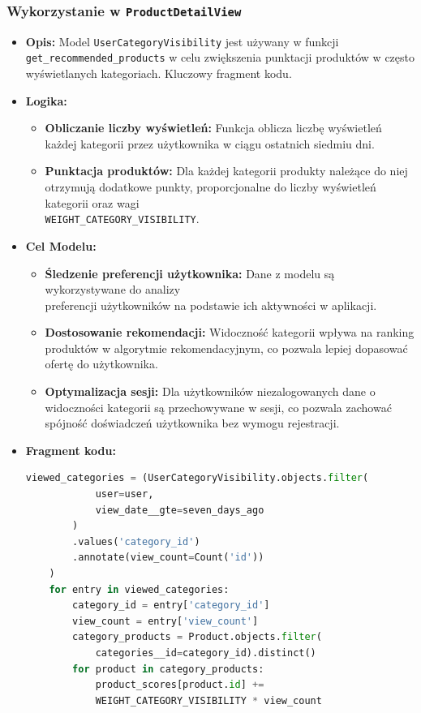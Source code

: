 \documentclass[12pt,a4paper,oneside]{article}
\theoremstyle{definition}
\numberwithin{equation}{section}
\begin{document}
\subsubsection{Wykorzystanie w \texttt{ProductDetailView}}
\begin{itemize}
    \item \textbf{Opis: }Model \texttt{UserCategoryVisibility} jest używany w funkcji 
        \texttt{get\_recommended\_products} w celu zwiększenia punktacji produktów w 
        często wyświetlanych kategoriach. Kluczowy fragment kodu.

    \item \textbf{Logika:}
        \begin{itemize}
            \item \textbf{Obliczanie liczby wyświetleń:} Funkcja oblicza liczbę wyświetleń każdej 
            kategorii przez użytkownika w ciągu ostatnich siedmiu dni.
            \item \textbf{Punktacja produktów:} Dla każdej kategorii produkty należące do niej otrzymują 
            dodatkowe punkty, proporcjonalne do liczby wyświetleń kategorii oraz wagi \\\texttt{WEIGHT\_CATEGORY\_VISIBILITY}.
        \end{itemize}
    
    \item \textbf{Cel Modelu:}
        \begin{itemize}
            \item \textbf{Śledzenie preferencji użytkownika:} Dane z modelu są wykorzystywane do analizy 
                \\preferencji użytkowników na podstawie ich aktywności w aplikacji.
            \item \textbf{Dostosowanie rekomendacji:} Widoczność kategorii wpływa na ranking produktów w algorytmie rekomendacyjnym, co pozwala lepiej dopasować ofertę do użytkownika.
            \item \textbf{Optymalizacja sesji:} Dla użytkowników niezalogowanych dane o widoczności kategorii są przechowywane w sesji, co pozwala zachować spójność doświadczeń użytkownika bez wymogu rejestracji.
        \end{itemize} 
    \item \textbf{Fragment kodu:}
        \begin{lstlisting}[language=Python, caption={Fragment \texttt{ProductDetailView}}]
    viewed_categories = (UserCategoryVisibility.objects.filter(
            user=user,
            view_date__gte=seven_days_ago
        )
        .values('category_id')
        .annotate(view_count=Count('id'))
    )
    for entry in viewed_categories:
        category_id = entry['category_id']
        view_count = entry['view_count']
        category_products = Product.objects.filter(
            categories__id=category_id).distinct()
        for product in category_products:
            product_scores[product.id] += 
            WEIGHT_CATEGORY_VISIBILITY * view_count
        \end{lstlisting}
\end{itemize}
\end{document}
